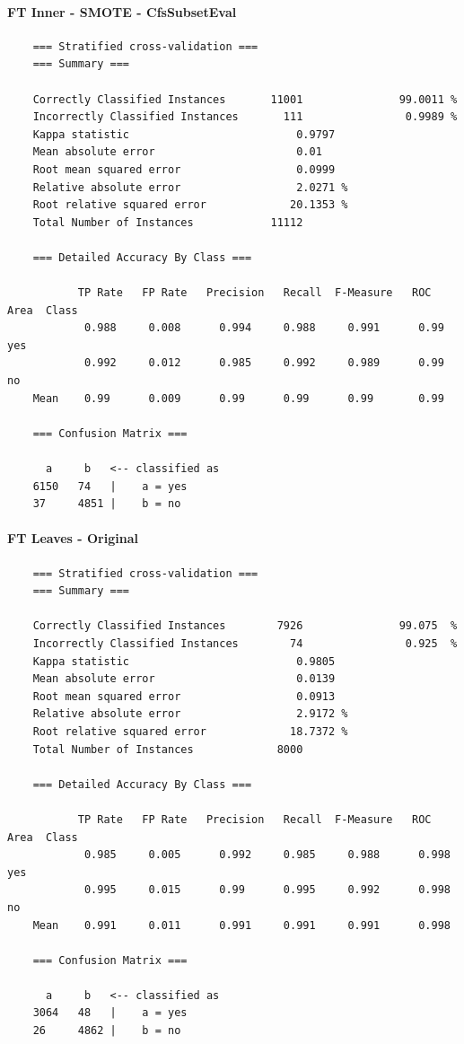 \paragraph{FT Inner - SMOTE - CfsSubsetEval}
{\footnotesize
	\begin{verbatim}
	=== Stratified cross-validation ===
	=== Summary ===
	
	Correctly Classified Instances       11001               99.0011 %
	Incorrectly Classified Instances       111                0.9989 %
	Kappa statistic                          0.9797
	Mean absolute error                      0.01  
	Root mean squared error                  0.0999
	Relative absolute error                  2.0271 %
	Root relative squared error             20.1353 %
	Total Number of Instances            11112     
	
	=== Detailed Accuracy By Class ===
	
	       TP Rate   FP Rate   Precision   Recall  F-Measure   ROC Area  Class
	        0.988     0.008      0.994     0.988     0.991      0.99     yes
	        0.992     0.012      0.985     0.992     0.989      0.99     no
	Mean    0.99      0.009      0.99      0.99      0.99       0.99 
	
	=== Confusion Matrix ===
	
	  a     b   <-- classified as
	6150   74   |    a = yes
	37     4851 |    b = no
	\end{verbatim}
}

\paragraph{FT Leaves - Original}
{\footnotesize
	\begin{verbatim}
	=== Stratified cross-validation ===
	=== Summary ===
	
	Correctly Classified Instances        7926               99.075  %
	Incorrectly Classified Instances        74                0.925  %
	Kappa statistic                          0.9805
	Mean absolute error                      0.0139
	Root mean squared error                  0.0913
	Relative absolute error                  2.9172 %
	Root relative squared error             18.7372 %
	Total Number of Instances             8000     
	
	=== Detailed Accuracy By Class ===
	
	       TP Rate   FP Rate   Precision   Recall  F-Measure   ROC Area  Class
	        0.985     0.005      0.992     0.985     0.988      0.998    yes
	        0.995     0.015      0.99      0.995     0.992      0.998    no
	Mean    0.991     0.011      0.991     0.991     0.991      0.998
	
	=== Confusion Matrix ===
	
	  a     b   <-- classified as
	3064   48   |    a = yes
	26     4862 |    b = no
	
	\end{verbatim}
}

